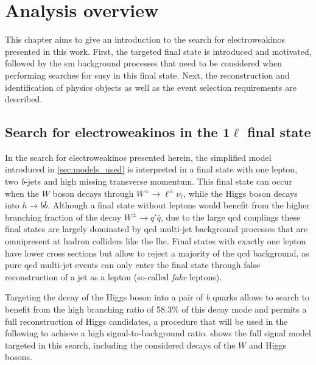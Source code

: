 
\chapter{Analysis overview}\label{ch:1lepton}

\ifpdf
    \graphicspath{{chapter-analysis/Figs/Raster/}{chapter-analysis/Figs/PDF/}{chapter-analysis/Figs/}}
\else
    \graphicspath{{chapter-analysis/Figs/Vector/}{chapter-analysis/Figs/}}
\fi


This chapter aims to give an introduction to the search for electroweakinos presented in this work. First, the targeted final state is introduced and motivated, followed by the \gls{sm} background processes that need to be considered when performing searches for \gls{susy} in this final state. Next, the reconstruction and identification of physics objects as well as the event selection requirements are described.

\section[Search for electroweakinos in the $1\ell$ final state]{Search for electroweakinos in the $\boldsymbol{1\ell}$ final state}

In the search for electroweakinos presented herein, the simplified model introduced in \cref{sec:models_used} is interpreted in a final state with one lepton, two \textit{b}-jets and high missing transverse momentum. This final state can occur when the $W$ boson decays through $W^\pm\rightarrow\ell^\pm\nu_\ell$, while the Higgs boson decays into $h\rightarrow b\bar{b}$. Although a final state without leptons would benefit from the higher branching fraction of the decay $W^\pm\rightarrow q'\bar{q}$, due to the large \gls{qcd} couplings these final states are largely dominated by \gls{qcd} multi-jet background processes that are omnipresent at hadron colliders like the \gls{lhc}. Final states with exactly one lepton have lower cross sections but allow to reject a majority of the \gls{qcd} background, as pure \gls{qcd} multi-jet events can only enter the \onelepton final state through false reconstruction of a jet as a lepton (so-called \textit{fake} leptons). 

Targeting the decay of the Higgs boson into a pair of \textit{b} quarks allows to search to benefit from the high branching ratio of 58.3\% of this decay mode and permits a full reconstruction of Higgs candidates, a procedure that will be used in the following to achieve a high signal-to-background ratio.   shows the full signal model targeted in this search, including the considered decays of the $W$ and Higgs bosons. 


